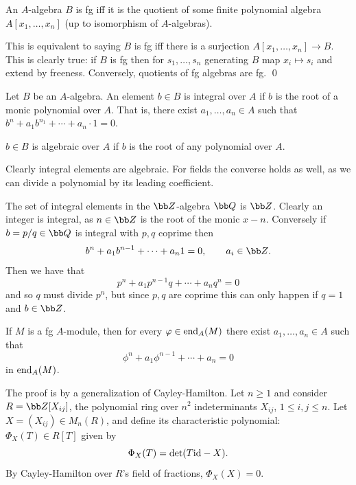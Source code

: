 \eexam

\blemm

    An $A$-algebra $B$ is fg iff it is the quotient of some finite polynomial algebra $A[x_1,\dots,x_n]$ (up to isomorphism of $A$-algebras).

\elemm

\bproof

    This is equivalent to saying $B$ is fg iff there is a surjection $A[x_1,\dots,x_n]\to B$.
    This is clearly true: if $B$ is fg then for $s_1,\dots,s_n$ generating $B$ map $x_i\mapsto s_i$ and extend by freeness.
    Conversely, quotients of fg algebras are fg.
    \qed

\eproof

\bdefn

    Let $B$ be an $A$-algebra.
    An element $b\in B$ is {\emphcolor integral} over $A$ if $b$ is the root of a monic polynomial over $A$.
    That is, there exist $a_1,\dots,a_n\in A$ such that $b^n+a_1b^{n_1}+\cdots+a_n\cdot1=0$.

    $b\in B$ is {\emphcolor algebraic} over $A$ if $b$ is the root of any polynomial over $A$.

\edefn

Clearly integral elements are algebraic.
For fields the converse holds as well, as we can divide a polynomial by its leading coefficient.

\bexam

    The set of integral elements in the $\bZ$-algebra $\bQ$ is $\bZ$.
    Clearly an integer is integral, as $n\in\bZ$ is the root of the monic $x-n$.
    Conversely if $b=p/q\in\bQ$ is integral with $p,q$ coprime then
    $$ b^n + a_1b^{n-1} + \cdots + a_n1 = 0,\qquad a_i\in\bZ . $$
    Then we have that
    $$ p^n + a_1p^{n-1}q + \cdots + a_nq^n = 0 $$
    and so $q$ must divide $p^n$, but since $p,q$ are coprime this can only happen if $q=1$ and $b\in\bZ$.

\eexam

\blemm

    If $M$ is a fg $A$-module, then for every $\varphi\in{\rm end}_A(M)$ there exist $a_1,\dots,a_n\in A$ such that
    $$ \phi^n + a_1\phi^{n-1} + \cdots + a_n = 0 $$
    in ${\rm end}_A(M)$.

\elemm

\bproof

    The proof is by a generalization of Cayley-Hamilton.
    Let $n\geq1$ and consider $R=\bZ[X_{ij}]$, the polynomial ring over $n^2$ indeterminants $X_{ij}$, $1\leq i,j\leq n$.
    Let $X=(X_{ij})\in M_n(R)$, and define its {\emphcolor characteristic polynomial}: $\Phi_X(T)\in R[T]$ given by
    $$ \Phi_X(T) = \det(T{\rm id} - X) . $$
    By Cayley-Hamilton over $R$'s field of fractions, $\Phi_X(X)=0$.

